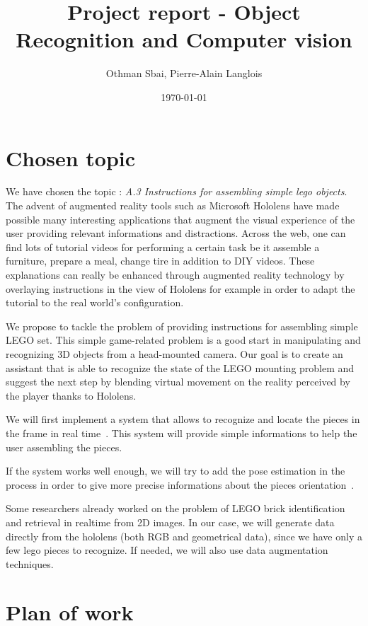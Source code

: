 \documentclass[a4paper,10pt]{article}
\title{Project report - Object Recognition and Computer vision}
\author{Othman Sbai, Pierre-Alain Langlois}
\date\today
\begin{document}
\maketitle
\section{Chosen topic}
We have chosen the topic : \emph{A.3 Instructions for assembling simple lego objects}.
\smallbreak
The advent of augmented reality tools such as Microsoft Hololens have made possible many interesting 
applications that augment the visual experience of the user providing relevant informations and 
distractions. Across the web, one can find lots of tutorial videos for performing a certain task be it 
assemble a furniture, prepare a meal, change tire in addition to DIY videos. These explanations can 
really be enhanced through augmented reality technology by overlaying instructions in the view of Hololens 
for example in order to adapt the tutorial to the real world’s configuration. 
\smallbreak

We propose to tackle the problem of providing instructions for assembling simple LEGO set. This simple 
game-related problem is a good start in manipulating and recognizing 3D objects from a head-mounted camera. 
Our goal is to create an assistant that is able to recognize the state of the LEGO mounting problem and 
suggest the next step by blending virtual movement on the reality perceived by the player thanks to 
Hololens.

\smallbreak

We will first implement a system that allows to recognize and locate the pieces in the frame in real time~\cite{redmon_you_2015}. 
This system will provide simple informations to help the user assembling the pieces.

If the system works well enough, we will try to add the pose estimation in the process in order to give 
more precise informations about the pieces orientation~\cite{wohlhart_learning_2015}.

\smallbreak
Some researchers already worked on the problem of LEGO brick identification and retrieval in realtime from 
2D images\cite{botha_realtime_2009}. In our case, we will generate data directly from the hololens (both 
RGB and geometrical data), since we have only a few lego pieces to recognize. If needed, we will also use 
data augmentation techniques. 
 
\section{Plan of work}
\end{document}
